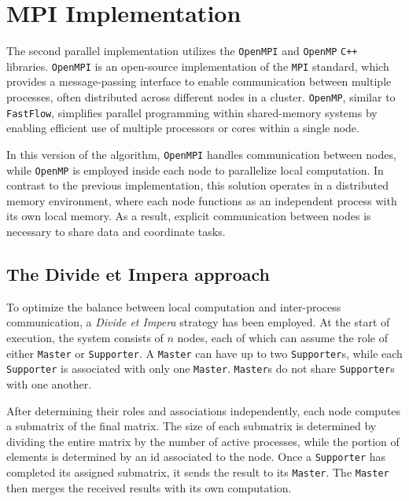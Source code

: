 \section*{MPI Implementation}
The second parallel implementation utilizes the \texttt{OpenMPI} and \texttt{OpenMP} \texttt{C++} libraries. \texttt{OpenMPI} is an open-source implementation of the \texttt{MPI} standard, which provides a message-passing interface to enable communication between multiple processes, often distributed across different nodes in a cluster. \texttt{OpenMP}, similar to \texttt{FastFlow}, simplifies parallel programming within shared-memory systems by enabling efficient use of multiple processors or cores within a single node.

\par In this version of the algorithm, \texttt{OpenMPI} handles communication between nodes, while \texttt{OpenMP} is employed inside each node to parallelize local computation. In contrast to the previous implementation, this solution operates in a distributed memory environment, where each node functions as an independent process with its own local memory. As a result, explicit communication between nodes is necessary to share data and coordinate tasks.

\subsection*{The Divide et Impera approach}

\par To optimize the balance between local computation and inter-process communication, a \textit{Divide et Impera} strategy has been employed. At the start of execution, the system consists of $n$ nodes, each of which can assume the role of either \texttt{Master} or \texttt{Supporter}. A \texttt{Master} can have up to two \texttt{Supporter}s, while each \texttt{Supporter} is associated with only one \texttt{Master}. \texttt{Master}s do not share \texttt{Supporter}s with one another.

After determining their roles and associations independently, each node computes a submatrix of the final matrix. The size of each submatrix is determined by dividing the entire matrix by the number of active processes, while the portion of elements is determined by an id associated to the node. Once a \texttt{Supporter} has completed its assigned submatrix, it sends the result to its \texttt{Master}. The \texttt{Master} then merges the received results with its own computation.

